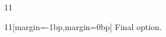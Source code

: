 \documentclass[paper=A4]{ropas-poster}
\begin{document}
\begin{postergrid}{1}{1}
\begin{posterblock}{1}{1}[margin=-1bp,margin=0bp]
Final option.
\end{posterblock}
\end{postergrid}
\end{document}
